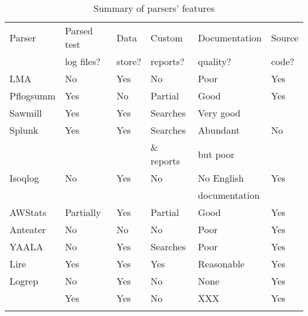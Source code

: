 \begin{table}[htb]
    \caption{Summary of parsers' features}
    \empty{}\label{Summary of parsers' features}
    \begin{tabular}{llllll}
        \tabletopline{}%
        Parser          & Parsed test   & Data              & Custom            & Documentation  & Source       \\
                        & log files?    & store?            & reports?          & quality?       & code?        \\
        \tablemiddleline{}%
        \gls{LMA}       & No            & Yes               & No                & Poor           & Yes          \\ 
        Pflogsumm       & Yes           & No                & Partial \dag{}    & Good           & Yes          \\
        Sawmill         & Yes           & Yes               & Searches          & Very good      & \nialpha{}   \\
        Splunk          & Yes           & Yes               & Searches          & Abundant       & No           \\
                        &               &                   & \& reports        & but poor       &              \\
        Isoqlog         & No            & Yes               & No                & No English     & Yes          \\
                        &               &                   &                   & documentation  &              \\
        AWStats         & Partially     & Yes               & Partial \dag{}    & Good           & Yes          \\
        Anteater        & No            & No                & No                & Poor           & Yes          \\
        YAALA           & No            & Yes \ddag{}       & Searches          & Poor           & Yes          \\
        Lire            & Yes           & Yes               & Yes               & Reasonable     & Yes          \\
        Logrep          & No            & Yes               & No                & None           & Yes          \\
        \parsername{}   & Yes           & Yes \nibeta{}     & No \nichi{}       & XXX            & Yes          \\
        \tablebottomline{}%
    \end{tabular}


\end{table}
